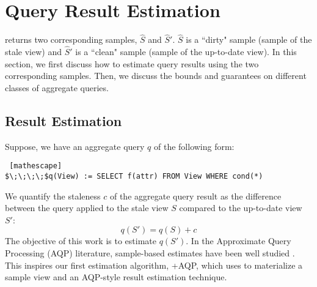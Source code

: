 \section{Query Result Estimation}
\label{correction}
\svc returns two corresponding samples, $\widehat{S}$ and $\widehat{S}'$.
$\widehat{S}$ is a ``dirty" sample (sample of the stale view) and $\widehat{S}'$ is a ``clean" sample (sample of the up-to-date view).
In this section, we first discuss how to estimate query results using the two corresponding samples. 
Then, we discuss the bounds and guarantees on different classes of aggregate queries.





\subsection{Result Estimation}\label{re}
Suppose, we have an aggregate query $q$ of the following form:
\begin{lstlisting} [mathescape]
$\;\;\;\;$q(View) := SELECT f(attr) FROM View WHERE cond(*)
\end{lstlisting}
We quantify the staleness $c$ of the aggregate query result as the difference
between the query applied to the stale view $S$ compared to the up-to-date view $S'$:
\[
q(S') = q(S) + c
\]
The objective of this work is to estimate $q(S')$.
In the Approximate Query Processing (AQP) literature, sample-based estimates have been well studied \cite{OlkenR86, AgarwalMPMMS13}.
This inspires our first estimation algorithm, \svcnospace+AQP, which uses \svc to materialize a sample view and an AQP-style
result estimation technique.

